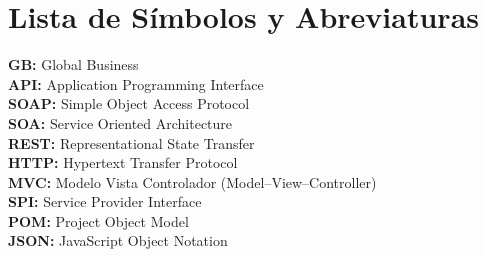 \chapter*{Lista de Símbolos y Abreviaturas}%

\vspace{5 mm}
\noindent
\textbf{GB:} Global Business\\
\textbf{API:} Application Programming Interface\\
\textbf{SOAP:} Simple Object Access Protocol\\ 
\textbf{SOA:} Service Oriented Architecture\\ 
\textbf{REST:} Representational State Transfer\\ 
\textbf{HTTP:} Hypertext Transfer Protocol\\ 
\textbf{MVC:} Modelo Vista Controlador (Model–View–Controller)\\ 
\textbf{SPI:} Service Provider Interface\\ 
\textbf{POM:} Project Object Model\\ 
\textbf{JSON:} JavaScript Object Notation\\
